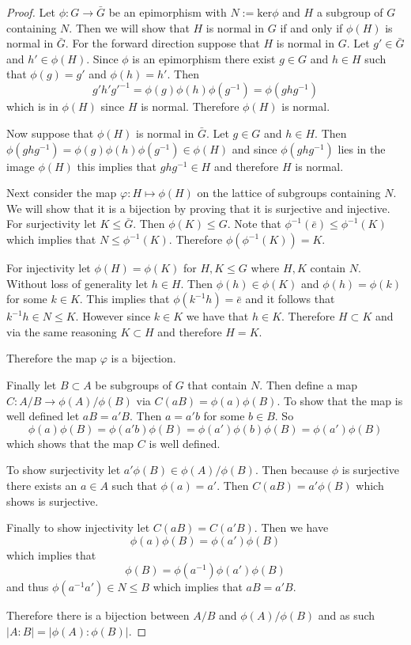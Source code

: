 \documentclass[10pt]{article}
\theoremstyle{plain}
\theoremstyle{remark}
\begin{document}
\begin{proof}
  Let $\phi:G\rightarrow \bar{G}$ be an epimorphism with $N:=\text{ker}\phi$ and $H$ a subgroup of $G$ containing $N$. Then
  we will show that $H$ is normal in $G$ if and only if $\phi(H)$ is normal in $\bar{G}$. For the forward
  direction suppose that $H$ is normal in $G$. Let $g'\in \bar{G}$ and $h'\in \phi(H)$. Since $\phi$ is an epimorphism
  there exist $g\in G$ and $h\in H$ such that $\phi(g)=g'$ and $\phi(h)=h'$. Then
  \[ g'h'g'^{-1}=\phi(g)\phi(h)\phi(g^{-1})=\phi(ghg^{-1})\]
  which is in $\phi(H)$ since $H$ is normal. Therefore $\phi(H)$ is normal.

  Now suppose that $\phi(H)$ is normal in $\bar{G}$. Let $g\in G$ and $h\in H$. Then
  $\phi(ghg^{-1})=\phi(g)\phi(h)\phi(g^{-1})\in\phi(H)$ and since $\phi(ghg^{-1})$ lies in the image $\phi(H)$ this implies
  that $ghg^{-1}\in H$ and therefore $H$ is normal.

  Next consider the map $\varphi:H\mapsto \phi(H)$ on the lattice of subgroups containing $N$.
  We will show that it is a bijection by proving that it is surjective and
  injective. For surjectivity let $K\leq \bar{G}$. Then $\phi(K)\leq G$. Note that
  $\phi^{-1}(\bar{e})\leq\phi^{-1}(K)$ which implies that $N\leq\phi^{-1}(K)$. Therefore $\phi(\phi^{-1}(K))=K$.

  For injectivity let $\phi(H)=\phi(K)$ for $H,K\leq G$ where $H,K$ contain $N$. Without loss of generality let
  $h\in H$. Then $\phi(h)\in\phi(K)$ and $\phi(h)=\phi(k)$ for some $k\in K$. This implies that $\phi(k^{-1}h)=\bar{e}$ and
  it follows that $k^{-1}h\in N\leq K$. However since $k\in K$ we have that $h\in K$. Therefore $H\subset K$ and via the
  same reasoning $K\subset H$ and therefore $H=K$.

  Therefore the map $\varphi$ is a bijection.

  Finally let $B\subset A$ be subgroups of $G$ that contain $N$. Then define a map $C:A/B\rightarrow \phi(A)/\phi(B)$
  via $C(aB)=\phi(a)\phi(B)$. To show that the map is well defined let $aB=a'B$. Then $a=a'b$ for some $b\in B$.
  So
  \[ \phi(a)\phi(B)=\phi(a'b)\phi(B)=\phi(a')\phi(b)\phi(B)=\phi(a')\phi(B)\]
  which shows that the map $C$ is well defined.

  To show surjectivity let $a'\phi(B)\in \phi(A)/\phi(B)$. Then because $\phi$ is surjective there exists an $a\in A$ such that
  $\phi(a)=a'$. Then $C(aB)=a'\phi(B)$ which shows is surjective.

  Finally to show injectivity let $C(aB)=C(a'B)$. Then we have
  \[ \phi(a)\phi(B)=\phi(a')\phi(B)\]
  which implies that
  \[ \phi(B)=\phi(a^{-1})\phi(a')\phi(B)\]
  and thus $\phi(a^{-1}a')\in N\leq B$ which implies that $aB=a'B$.

  Therefore there is a bijection between $A/B$ and $\phi(A)/\phi(B)$ and as such $|A:B|=|\phi(A):\phi(B)|$.
\end{proof}
\end{document}
